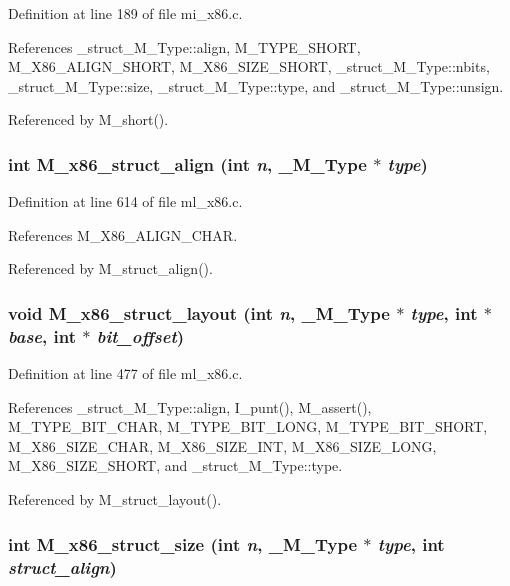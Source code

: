 Definition at line 189 of file mi\_\-x86.c.

References \_\-struct\_\-M\_\-Type::align, M\_\-TYPE\_\-SHORT, M\_\-X86\_\-ALIGN\_\-SHORT, M\_\-X86\_\-SIZE\_\-SHORT, \_\-struct\_\-M\_\-Type::nbits, \_\-struct\_\-M\_\-Type::size, \_\-struct\_\-M\_\-Type::type, and \_\-struct\_\-M\_\-Type::unsign.

Referenced by M\_\-short().
\subsubsection{\setlength{\rightskip}{0pt plus 5cm}int M\_\-x86\_\-struct\_\-align (int {\em n}, \bf{\_\-M\_\-Type} $\ast$ {\em type})}\label{m__x86_8h_7deb558bda1f1ad54bd0b5f7f989f50d}




Definition at line 614 of file ml\_\-x86.c.

References M\_\-X86\_\-ALIGN\_\-CHAR.

Referenced by M\_\-struct\_\-align().
\subsubsection{\setlength{\rightskip}{0pt plus 5cm}void M\_\-x86\_\-struct\_\-layout (int {\em n}, \bf{\_\-M\_\-Type} $\ast$ {\em type}, int $\ast$ {\em base}, int $\ast$ {\em bit\_\-offset})}\label{m__x86_8h_d2ed2e7ed8f48f7e74e131c8fb1162f1}




Definition at line 477 of file ml\_\-x86.c.

References \_\-struct\_\-M\_\-Type::align, I\_\-punt(), M\_\-assert(), M\_\-TYPE\_\-BIT\_\-CHAR, M\_\-TYPE\_\-BIT\_\-LONG, M\_\-TYPE\_\-BIT\_\-SHORT, M\_\-X86\_\-SIZE\_\-CHAR, M\_\-X86\_\-SIZE\_\-INT, M\_\-X86\_\-SIZE\_\-LONG, M\_\-X86\_\-SIZE\_\-SHORT, and \_\-struct\_\-M\_\-Type::type.

Referenced by M\_\-struct\_\-layout().
\subsubsection{\setlength{\rightskip}{0pt plus 5cm}int M\_\-x86\_\-struct\_\-size (int {\em n}, \bf{\_\-M\_\-Type} $\ast$ {\em type}, int {\em struct\_\-align})}\label{m__x86_8h_63084addfc53362b05cd57c6014f9ee7}




